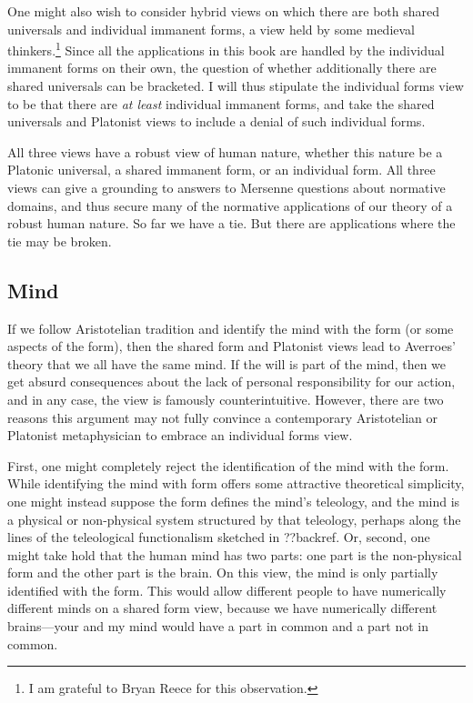 One might also wish to consider hybrid views on which there are both shared universals and individual immanent 
forms, a view held by some medieval thinkers.\footnote{I am grateful to Bryan Reece for this observation.} Since all the applications in this book are 
handled by the individual immanent forms on their own, the question of whether additionally there are shared universals
can be bracketed. I will thus stipulate the individual forms view to be that there are \textit{at least} individual
immanent forms, and take the shared universals and Platonist views to include a denial of such individual forms.

All three views have a robust view of human nature, whether this nature be a Platonic universal, a shared immanent form, 
or an individual form. All three views can give a grounding to answers to Mersenne questions about normative 
domains, and thus secure many of the normative applications of our theory of a robust human nature. So far we have
a tie. But there
are applications where the tie may be broken.

\subsection{Mind}
If we follow Aristotelian tradition and identify the mind with the form (or some aspects of the form), then the shared form and Platonist
views lead to Averroes' theory that we all have the same mind. If the will is part of the mind, then we get absurd consequences
about the lack of personal responsibility for our action, and in any case, the view is famously counterintuitive. However, 
there are two reasons this argument may not fully convince a contemporary Aristotelian or Platonist metaphysician to embrace an individual
forms view. 

First, one might completely reject the identification of the mind with the form. While identifying the mind with 
form offers some attractive theoretical simplicity, one might instead suppose the form defines the mind's teleology, and the mind is a physical or non-physical system 
structured by that teleology, perhaps along the lines of the teleological functionalism sketched in ??backref. Or, second,
one might take hold that the human mind has two parts: one part is the non-physical form and the other part is the brain.
On this view, the mind is only partially identified with the form. This would allow different people to have numerically different
minds on a shared form view, because we have numerically different brains---your and my mind would have a part in common
and a part not in common. 

